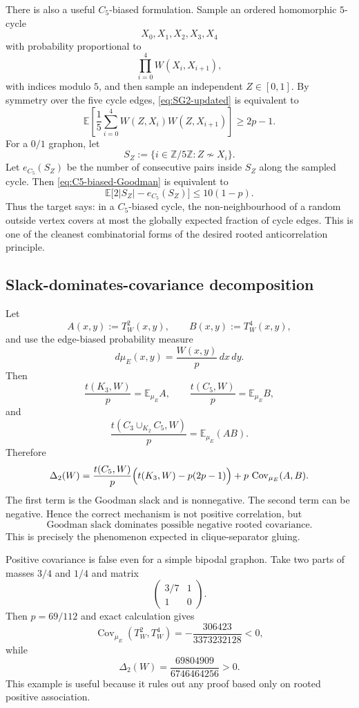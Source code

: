 \documentclass[11pt]{article}
\theoremstyle{definition}
\begin{document}
There is also a useful $C_5$-biased formulation.  Sample an ordered homomorphic $5$-cycle
\[
  X_0,X_1,X_2,X_3,X_4
\]
with probability proportional to
\[
  \prod_{i=0}^4 W(X_i,X_{i+1}),
\]
with indices modulo $5$, and then sample an independent $Z\in[0,1]$.  By symmetry over the five cycle edges, \eqref{eq:SG2-updated} is equivalent to
\begin{equation}\label{eq:C5-biased-Goodman}
  \mathbb E\left[\frac15\sum_{i=0}^4
  W(Z,X_i)W(Z,X_{i+1})\right]
  \ge 2p-1.
\end{equation}
For a $0/1$ graphon, let
\[
  S_Z:=\{i\in\mathbb Z/5\mathbb Z: Z\not\sim X_i\}.
\]
Let $e_{C_5}(S_Z)$ be the number of consecutive pairs inside $S_Z$ along the sampled cycle.  Then \eqref{eq:C5-biased-Goodman} is equivalent to
\begin{equation}\label{eq:covering-form}
  \mathbb E\bigl[2|S_Z|-e_{C_5}(S_Z)\bigr]\le 10(1-p).
\end{equation}
Thus the target says: in a $C_5$-biased cycle, the non-neighbourhood of a random outside vertex covers at most the globally expected fraction of cycle edges.  This is one of the cleanest combinatorial forms of the desired rooted anticorrelation principle.

\subsection{Slack-dominates-covariance decomposition}

Let
\[
  A(x,y):=T_W^2(x,y),\qquad B(x,y):=T_W^4(x,y),
\]
and use the edge-biased probability measure
\[
  d\mu_E(x,y)=\frac{W(x,y)}p\,dx\,dy.
\]
Then
\[
  \frac{t(K_3,W)}p=\mathbb E_{\mu_E}A,
  \qquad
  \frac{t(C_5,W)}p=\mathbb E_{\mu_E}B,
\]
and
\[
  \frac{t(C_3\cup_{K_2}C_5,W)}p=\mathbb E_{\mu_E}(AB).
\]
Therefore
\begin{equation}\label{eq:covariance-decomp}
  \Delta_2(W)=
  \frac{t(C_5,W)}p\Bigl(t(K_3,W)-p(2p-1)\Bigr)
  +p\,\operatorname{Cov}_{\mu_E}(A,B).
\end{equation}
The first term is the Goodman slack and is nonnegative.  The second term can be negative.  Hence the correct mechanism is not positive correlation, but
\[
        \text{Goodman slack dominates possible negative rooted covariance.}
\]
This is precisely the phenomenon expected in clique-separator gluing.

Positive covariance is false even for a simple bipodal graphon.  Take two parts of masses $3/4$ and $1/4$ and matrix
\[
  \begin{pmatrix}3/7&1\\1&0\end{pmatrix}.
\]
Then $p=69/112$ and exact calculation gives
\[
  \operatorname{Cov}_{\mu_E}(T_W^2,T_W^4)
  =-\frac{306423}{3373232128}<0,
\]
while
\[
  \Delta_2(W)=\frac{69804909}{6746464256}>0.
\]
This example is useful because it rules out any proof based only on rooted positive association.
\end{document}
